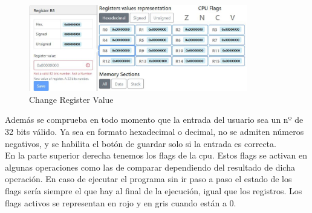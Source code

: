 {{            \begin{figure}[h]
                \centering
                \includegraphics[width=0.85\textwidth]{images/modifyregister}
                \caption{Change Register Value}
            \end{figure}

            Además se comprueba en todo momento que la entrada del usuario sea un nº de 32 bits válido.
            Ya sea en formato hexadecimal o decimal, no se admiten números negativos, y se habilita el botón
            de guardar solo si la entrada es correcta. \\

            En la parte superior derecha tenemos los flags de la cpu. Estos flags se activan en algunas operaciones
            como las de comparar dependiendo del resultado de dicha operación. En caso de ejecutar el programa sin ir
            paso a paso el estado de los flags sería siempre el que hay al final de la ejecución, 
            igual que los registros. Los flags activos se representan en rojo y en gris cuando están a 0.
            \clearpage


        }

}
